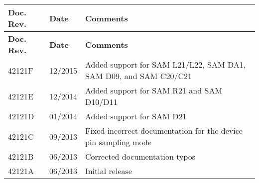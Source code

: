 \tabulinesep=1mm
\begin{longtabu}spread 0pt [c]{*{3}{|X[-1]}|}
\hline
\cellcolor{\tableheadbgcolor}\textbf{ Doc. Rev. }&\cellcolor{\tableheadbgcolor}\textbf{ Date }&\cellcolor{\tableheadbgcolor}\textbf{ Comments  }\\
\endfirsthead
\hline
\endfoot
\hline
\cellcolor{\tableheadbgcolor}\textbf{ Doc. Rev. }&\cellcolor{\tableheadbgcolor}\textbf{ Date }&\cellcolor{\tableheadbgcolor}\textbf{ Comments  }\\
\endhead
42121F &12/2015 &Added support for SAM L21/\+L22, SAM DA1, SAM D09, and SAM C20/\+C21  \\
42121E &12/2014 &Added support for SAM R21 and SAM D10/\+D11  \\
42121D &01/2014 &Added support for SAM D21  \\
42121C &09/2013 &Fixed incorrect documentation for the device pin sampling mode  \\
42121B &06/2013 &Corrected documentation typos  \\
42121A &06/2013 &Initial release  \\
\end{longtabu}
